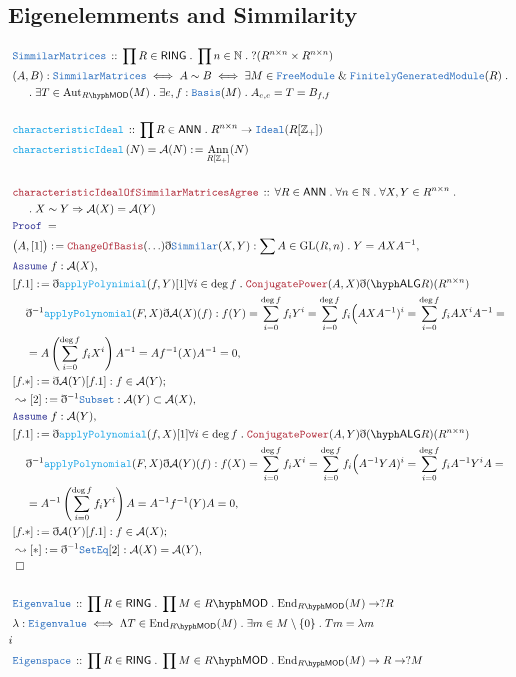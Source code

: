 \documentclass[12pt]{scrartcl}
\newcommand{\TYPE}[1]{\textcolor{NavyBlue}{\mathtt{#1}}}
\newcommand{\FUNC}[1]{\textcolor{Cerulean}{\mathtt{#1}}}
\newcommand{\LOGIC}[1]{\textcolor{Blue}{\mathtt{#1}}}
\newcommand{\THM}[1]{\textcolor{Maroon}{\mathtt{#1}}}
\renewcommand{\.}{\; . \;}
\newcommand{\de}{: \kern 0.1pc =}
\newcommand{\Act}[1]{\left(#1\right)}
\newcommand{\Theorem}[2]{& \THM{#1} \, :: \, #2 \\ & \Proof = \\ }
\newcommand{\DeclareType}[2]{& \TYPE{#1} \, :: \, #2 \\}
\newcommand{\DefineType}[3]{& #1 : \TYPE{#2} \iff #3 \\}
\newcommand{\DefineNamedType}[4]{& #1 : \TYPE{#2} \iff #3 \iff #4 \\}
\newcommand{\DeclareFunc}[2]{& \FUNC{#1} \, :: \, #2 \\}
\newcommand{\DefineNamedFunc}[4]{&  \FUNC{#1}\Act{#2} = #3 \de #4 \\}
\newcommand{\NewLine}{\\ & \kern 1pc}
\newcommand{\Page}[1]{ \begin{align*} #1 \end{align*}   }
\newcommand{ \bd }{ \ByDef }
\renewcommand{\And}{\; \& \;}
\newcommand{\Int}{\mathbb{Z} }
\newcommand{\Nat}{\mathbb{N} }
\newcommand{\Aut}{\mathrm{Aut}}
\newcommand{\End}{\mathrm{End}}
\newcommand{\Say}[3]{& #1 \de #2 : #3, \\}
\newcommand{\Conclude}[3]{& #1 \de #2 : #3; \\}
\newcommand{\Derive}[3]{& \leadsto #1 \de #2 : #3, \\}
\newcommand{\Assume}[2]{& \LOGIC{Assume} \; #1 : #2, \\}
\newcommand{\QED}{\; \square}
\newcommand{\EndProof}{& \QED \\}
\newcommand{\ByDef}{\eth}
\newcommand{\Proof}{\LOGIC{Proof} \; }
\newcommand{\A}{\mathcal{A}}
\newcommand{\FGM}{\TYPE{FinitelyGeneratedModule}}
\newcommand{\FM}{\TYPE{FreeModule}}
\newcommand{\GL}{\mathrm{GL}}
\DeclareMathOperator{\Ann}{Ann}
\newcommand{\LMOD}[1]{#1\hyph\mathsf{MOD}}
\newcommand{\Ideal}{\TYPE{Ideal}}
\newcommand{\RING}{\mathsf{RING}}
\newcommand{\ANN}{\mathsf{ANN}}
\newcommand{\LALG}[1]{#1\hyph\mathsf{ALG}}
\begin{document}
\subsection{Eigenelemments and Simmilarity}
\Page{
	\DeclareType{SimmilarMatrices}{\prod R \in \RING \. \prod n \in \Nat \. ?(R^{n\times n} \times R^{n\times n})}
	\DefineNamedType{(A,B)}{SimmilarMatrices}{A \sim B}
	{
		\exists M \in \FM \And \FGM(R) \. 
		\NewLine \.
		\exists T \in \Aut_{\LMOD{R}}(M) \.
		\exists e,f : \TYPE{Basis}(M) \.
		 A_{e,e} = T = B_{f,f}
	}
	\\
	\DeclareFunc{characteristicIdeal}{\prod R \in \ANN \. R^{n\times n} \to\Ideal(R[\Int_+])}
	\DefineNamedFunc{characteristicIdeal}{N}{\A(N)}{ \Ann_{R[\Int_+]}(N) }
	\\
	\Theorem{characteristicIdealOfSimmilarMatricesAgree}{
		\forall R \in \ANN \. \forall n \in \Nat \. 
		\forall X,Y \in R^{n \times n} \. \NewLine \. 
		X \sim Y \Rightarrow \A(X) = \A(Y)
	}
	\Say{\big(A,[1]\big)}{\THM{ChangeOfBasis}(\ldots)\bd \TYPE{Simmilar}(X,Y)}{ \sum A \in \GL(R,n) \. Y =  A X A^{-1}}
	\Assume{f}{\A(X)}
	\Say{[f.1]}{ 
		\bd \FUNC{applyPolynimial}(f,Y)[1]\forall i \in \deg f \. \THM{ConjugatePower}(A,X) 
		\bd \LALG(R)(R^{n\times n}) \NewLine \bd^{-1}\FUNC{applyPolynomial}(F,X) \bd \A(X)(f)
	}
	{
			f(Y) = 
			\sum^{\deg f}_{i=0} f_i Y^i = 
			\sum^{\deg f}_{i=0} f_i \Big(AXA^{-1})^i = 
			\sum^{\deg f}_{i=0} f_i  A X^{i} A^{-1} = \NewLine =
			A\left(\sum^{\deg f}_{i=0} f_iX^{i} \right) A^{-1} =
			Af^{-1}(X)A^{-1} = 0
	}
	\Conclude{[f.*]}{\bd \A(Y)[f.1]}{f \in \A(Y)}
	\Derive{[2]}{\bd^{-1}\TYPE{Subset}}{\A(Y) \subset \A(X)}
	\Assume{f}{\A(Y)}
	\Say{[f.1]}{ 
		\bd \FUNC{applyPolynomial}(f,X)[1]\forall i \in \deg f \. \THM{ConjugatePower}(A,Y) 
		\bd \LALG(R)(R^{n\times n}) \NewLine \bd^{-1}\FUNC{applyPolynomial}(F,X) \bd \A(Y)(f)
	}
	{
			f(X) = 
			\sum^{\deg f}_{i=0} f_i X^i = 
			\sum^{\deg f}_{i=0} f_i \Big(A^{-1}YA)^i = 
			\sum^{\deg f}_{i=0} f_i  A^{-1} Y^{i} A = \NewLine =
			A^{-1}\left(\sum^{\deg f}_{i=0} f_iY^{i} \right) A =
			A^{-1}f^{-1}(Y)A = 0
	}
	\Conclude{[f.*]}{\bd \A(Y)[f.1]}{f \in \A(X)}
	\Derive{[*]}{\bd^{-1}\TYPE{SetEq}[2]}{\A(X) = \A(Y)}
	\EndProof
	\\
	\DeclareType{Eigenvalue}{\prod R \in \RING \. \prod M \in \LMOD{R} \. \End_{\LMOD{R}}(M) \to ?R}
	\DefineType{\lambda}{Eigenvalue}{\Lambda T \in \End_{\LMOD{R}}(M) \. \exists m \in M \setminus \{0\} \. Tm = \lambda m}i
	\\
	\DeclareType{Eigenspace}{\prod R \in \RING \. \prod M \in \LMOD{R} \. \End_{\LMOD{R}}(M) \to R \to ?M}
}
\end{document}
